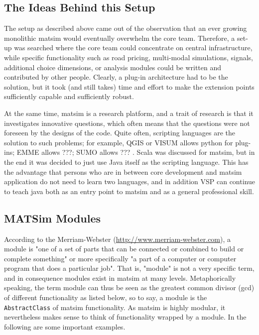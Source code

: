 \subsection{The Ideas Behind this Setup}
The setup as described above came out of the observation that an ever growing monolithic \gls{matsim} would eventually overwhelm the core team. Therefore, a set-up was searched where the core team could concentrate on central infrastructure, while specific functionality such as road pricing, multi-modal simulations, signals, additional choice dimensions, or analysis modules could be written and contributed by other people. Clearly, a plug-in architecture had to be the solution, but it took (and still takes) time and effort to make the extension points sufficiently capable and sufficiently robust.  

At the same time, \gls{matsim} is a research platform, and a trait of research is that it investigates innovative questions, which often means that the questions were not foreseen by the designs of the code.  Quite often, scripting languages are the solution to such problems; for example, QGIS or VISUM allows python \cite{...} for plug-ins; EMME allows ???; SUMO allows ??? .  Scala \cite{...} was discussed for \gls{matsim}, but in the end it was decided to just use Java itself as the scripting language. This has the advantage that persons who are in between core development and \gls{matsim} application do not need to learn two languages, and in addition VSP can continue to teach \gls{java} both as an entry point to \gls{matsim} and as a general professional skill.

\subsection{MATSim Modules}
According to the Merriam-Webster (\url{http://www.merriam-webster.com}), a module is
%
"one of a set of parts that can be connected or combined to build or complete something" 
%
or more specifically
%
"a part of a computer or computer program that does a particular job". 
%
That is, "module" is not a very specific term, and in consequence modules exist in \gls{matsim} at many levels. Metaphorically speaking, the term module can thus be seen as the greatest common divisor (gcd) of different functionality as listed below, so to say, a module is the \lstinline|AbstractClass| of \gls{matsim} functionality. As \gls{matsim} is highly modular, it nevertheless makes sense to think of functionality wrapped by a module. In the following are some important examples.

